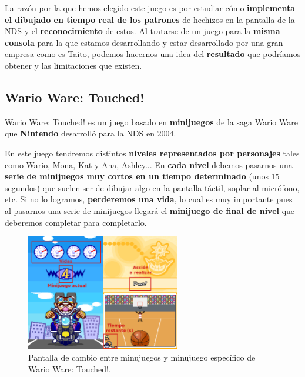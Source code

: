 La razón por la que hemos elegido este juego es por estudiar cómo \textbf{implementa el dibujado en tiempo real de los patrones} de hechizos en la pantalla de la NDS y el \textbf{reconocimiento} de estos. Al tratarse de un juego para la \textbf{misma consola} para la que estamos desarrollando y estar desarrollado por una gran empresa como es Taito, podemos hacernos una idea del \textbf{resultado} que podríamos obtener y las limitaciones que existen.

\vspace{1cm}

\subsection{Wario Ware: Touched!}

Wario Ware: Touched!  es un juego basado en \textbf{minijuegos} de la saga Wario Ware que \textbf{Nintendo} desarrolló para la NDS en 2004.

\vspace{0.5cm}

En este juego tendremos distintos \textbf{niveles representados por personajes} tales como Wario, Mona, Kat y Ana, Ashley... En \textbf{cada nivel} debemos pasarnos una \textbf{serie de minijuegos muy cortos en un tiempo determinado} (unos 15 segundos) que suelen ser de dibujar algo en la pantalla táctil, soplar al micrófono, etc. Si no lo logramos, \textbf{perderemos una vida}, lo cual es muy importante pues al pasarnos una serie de minijuegos llegará el \textbf{minijuego de final de nivel} que deberemos completar para completarlo.

\clearpage


\begin{figure}[htbp]
\centering
  \includegraphics[width=0.6\textwidth]{archivos/wario_ware_level.png}
  \caption{Pantalla de cambio entre minujuegos y minujuego específico de Wario Ware: Touched!.}
  \label{fig:wario_ware_level}
\end{figure}


